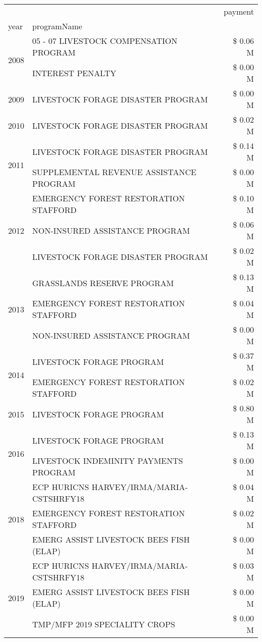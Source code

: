 \begin{tabular}{llr}
\toprule
 &  & payment \\
year & programName &  \\
\midrule
\multirow[t]{2}{*}{2008} & 05 - 07 LIVESTOCK COMPENSATION PROGRAM & \$ 0.06 M \\
 & INTEREST PENALTY & \$ 0.00 M \\
\cline{1-3}
2009 & LIVESTOCK FORAGE DISASTER  PROGRAM & \$ 0.00 M \\
\cline{1-3}
2010 & LIVESTOCK FORAGE DISASTER PROGRAM & \$ 0.02 M \\
\cline{1-3}
\multirow[t]{2}{*}{2011} & LIVESTOCK FORAGE DISASTER PROGRAM & \$ 0.14 M \\
 & SUPPLEMENTAL REVENUE ASSISTANCE PROGRAM & \$ 0.00 M \\
\cline{1-3}
\multirow[t]{3}{*}{2012} & EMERGENCY FOREST RESTORATION STAFFORD & \$ 0.10 M \\
 & NON-INSURED ASSISTANCE PROGRAM & \$ 0.06 M \\
 & LIVESTOCK FORAGE DISASTER PROGRAM & \$ 0.02 M \\
\cline{1-3}
\multirow[t]{3}{*}{2013} & GRASSLANDS RESERVE PROGRAM & \$ 0.13 M \\
 & EMERGENCY FOREST RESTORATION STAFFORD & \$ 0.04 M \\
 & NON-INSURED ASSISTANCE PROGRAM & \$ 0.00 M \\
\cline{1-3}
\multirow[t]{2}{*}{2014} & LIVESTOCK FORAGE PROGRAM & \$ 0.37 M \\
 & EMERGENCY FOREST RESTORATION STAFFORD & \$ 0.02 M \\
\cline{1-3}
2015 & LIVESTOCK FORAGE PROGRAM & \$ 0.80 M \\
\cline{1-3}
\multirow[t]{2}{*}{2016} & LIVESTOCK FORAGE PROGRAM & \$ 0.13 M \\
 & LIVESTOCK INDEMINITY PAYMENTS PROGRAM & \$ 0.00 M \\
\cline{1-3}
\multirow[t]{3}{*}{2018} & ECP HURICNS HARVEY/IRMA/MARIA-CSTSHRFY18 & \$ 0.04 M \\
 & EMERGENCY FOREST RESTORATION STAFFORD & \$ 0.02 M \\
 & EMERG ASSIST LIVESTOCK BEES FISH (ELAP) & \$ 0.00 M \\
\cline{1-3}
\multirow[t]{3}{*}{2019} & ECP HURICNS HARVEY/IRMA/MARIA-CSTSHRFY18 & \$ 0.03 M \\
 & EMERG ASSIST LIVESTOCK BEES FISH (ELAP) & \$ 0.00 M \\
 & TMP/MFP 2019 SPECIALITY CROPS & \$ 0.00 M \\

\end{tabular}
